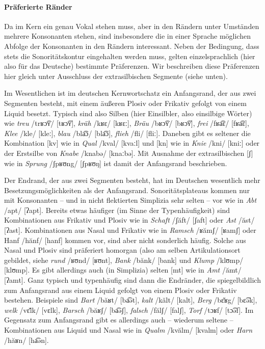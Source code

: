 \paragraph*{Präferierte Ränder}

Da im Kern ein genau Vokal stehen muss, aber in den Rändern unter Umständen mehrere Konsonanten stehen, sind insbesondere die in einer Sprache möglichen Abfolge der Konsonanten in den Rändern interessant.
Neben der Bedingung, dass stets die Sonoritätskontur eingehalten werden muss, gelten einzelsprachlich (hier also für das Deutsche) bestimmte Präferenzen.
Wir beschreiben diese Präferenzen hier gleich unter Ausschluss der extrasilbischen Segmente (siehe unten).

Im Wesentlichen ist im deutschen Kernwortschatz ein Anfangsrand, der aus zwei Segmenten besteht, mit einem äußeren Plosiv oder Frikativ gefolgt von einem Liquid besetzt.
Typisch sind also Silben (hier Einsilbler, also einsilbige Wörter) wie \textit{treu} /trʁɔ͡ʏ/ [tʁɔ͡ʏ], \textit{kräh} /kʁɛ/ [kʁɛː], \textit{Bräu} /bʁɔ͡ʏ/ [bʁɔ͡ʏ], \textit{frei} /fʁa͡ɛ/ [fʁa͡ɛ], \textit{Klee} /kle/ [kleː], \textit{blau} /bla͡ɔ/ [bla͡ɔ], \textit{flieh} /fli/ [fliː].
Daneben gibt es seltener die Kombination [kv] wie in \textit{Qual} /kval/ [kvaːl] und [kn] wie in \textit{Knie} /kni/ [kniː] oder der Erstsilbe von \textit{Knabe} /knabə/ [knaːbə].
Mit Ausnahme der extrasilbischen [ʃ] wie in \textit{Sprung} /ʃpʁʊng/ [ʃpʁʊŋ] ist damit der Anfangsrand beschrieben.

Der Endrand, der aus zwei Segmenten besteht, hat im Deutschen wesentlich mehr Besetzungsmöglichkeiten als der Anfangsrand.
Sonoritätsplateaus kommen nur mit Konsonanten -- und in nicht flektierten Simplizia sehr selten -- vor wie in \textit{Abt} /apt/ [ʔapt].
Bereits etwas häufiger (im Sinne der Typenhäufigkeit) sind Kombinationen aus Frikativ und Plosiv wie in \textit{Schaft} /ʃăft/ [ʃaft] oder \textit{Ast} /ăst/ [ʔast].
Kombinationen aus Nasal und Frikativ wie in \textit{Ramsch} /ʁămʃ/ [ʁamʃ] oder Hanf /hănf/ [hanf] kommen vor, sind aber nicht sonderlich häufig.
Solche aus Nasal und Plosiv sind präferiert homorgan (also am selben Artikulationsort gebildet, siehe \textit{rund} /ʁʊnd/ [ʁʊnt], \textit{Bank} /bănk/ [bank] und \textit{Klump} /klʊmp/ [klʊmp].
Es gibt allerdings auch (in Simplizia) selten [mt] wie in \textit{Amt} /ămt/ [ʔamt].
Ganz typisch und typenhäufig sind dann die Endränder, die spiegelbildlich zum Anfangsrand aus einem Liquid gefolgt von einem Plosiv oder Frikativ bestehen.
Beispiele sind \textit{Bart} /băʁt/ [ba͡ət], \textit{kalt} /kălt/ [kalt], \textit{Berg} /bɛ̆ʁg/ [bɛ͡ək], \textit{welk} /vɛ̆lk/ [vɛlk], \textit{Barsch} /băʁʃ/ [ba͡əʃ], \textit{falsch} /fălʃ/ [falʃ], \textit{Torf} /tɔʁf/ [tɔ͡əf]. 
Im Gegensatz zum Anfangsrand gibt es allerdings auch -- wiederum seltene -- Kombinationen aus Liquid und Nasal wie in \textit{Qualm} /kvălm/ [kvalm] oder \textit{Harn} /hăʁn/ [ha͡ən].

